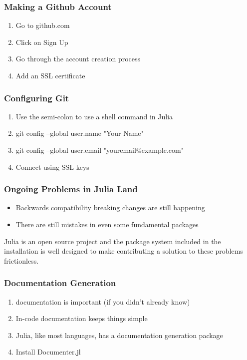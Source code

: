 \documentclass{beamer}
\begin{document}
\begin{frame}
\frametitle{Making a Github Account}

\begin{enumerate}
  \item Go to github.com
  \item Click on Sign Up
  \item Go through the account creation process
  \item Add an SSL certificate
\end{enumerate}

\end{frame}

\begin{frame}
\frametitle{Configuring Git}

\begin{enumerate}
  \item Use the semi-colon to use a shell command in Julia
  \item git config --global user.name "Your Name"
  \item git config --global user.email "youremail@example.com"
  \item Connect using SSL keys
\end{enumerate}

\end{frame}

\begin{frame}
\frametitle{Ongoing Problems in Julia Land}

\begin{itemize}
  \item Backwards compatibility breaking changes are still happening
  \item There are still mistakes in even some fundamental packages
\end{itemize}

Julia is an open source project and the package system included in the
installation is well designed to make contributing a solution to these 
problems frictionless.

\end{frame}

\begin{frame}
\frametitle{Documentation Generation}

\begin{enumerate}
  \item documentation is important (if you didn't already know)
  \item In-code documentation keeps things simple
  \item Julia, like most languages, has a documentation generation package
  \item Install Documenter.jl
\end{enumerate}

\end{frame}
\end{document}
